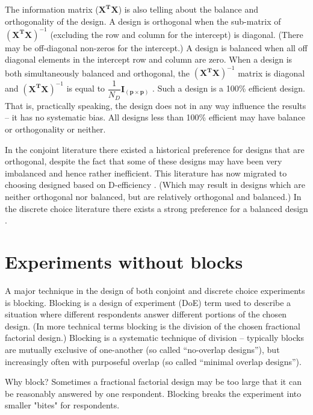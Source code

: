 \documentclass{article}
\begin{document}
The information matrix ($\mathbf{X^{T}X}$) is also telling about the balance and orthogonality of the design.
A design is orthogonal when the sub-matrix of $(\mathbf{X^{T}X})^{-1}$ (excluding the row and column for the intercept) is diagonal. (There may be off-diagonal non-zeros for the intercept.)
A design is balanced when all off diagonal elements in the intercept row and column are zero.
When a design is both simultaneously balanced and orthogonal, the $(\mathbf{X^{T}X})^{-1}$ matrix is diagonal and $(\mathbf{X^{T}X})^{-1}$ is equal to $\dfrac{1}{N_D}\mathbf{I_{(p\times p)}}$ \citep[63]{kuhfeld2010marketingresearch}.
Such a design is a 100\% efficient design.
That is, practically speaking, the design does not in any way influence the results -- it has no systematic bias.
All designs less than 100\% efficient may have balance or orthogonality or neither.

In the conjoint literature there existed a historical preference for designs that are orthogonal, despite the fact that some of these designs may have been very imbalanced and hence rather inefficient.
This literature has now migrated to choosing designed based on D-efficiency \citep{kuhfeld2010marketingresearch}.
(Which may result in designs which are neither orthogonal nor balanced, but are relatively orthogonal and balanced.)
In the discrete choice literature there exists a strong preference for a balanced design \citep{hensherrosegreene2015}.

\section{Experiments without blocks}
A major technique in the design of both conjoint and discrete choice experiments is blocking.
Blocking is a design of experiment (DoE) term used to describe a situation where different respondents answer different portions of the chosen design.
(In more technical terms blocking is the division of the chosen fractional factorial design.)
Blocking is a systematic technique of division -- typically blocks are mutually exclusive of one-another (so called \enquote{no-overlap designs}), but increasingly often with purposeful overlap (so called \enquote{minimal overlap designs}).

Why block?
Sometimes a fractional factorial design may be too large that it can be reasonably answered by one respondent.
Blocking breaks the experiment into smaller "bites" for respondents.
\end{document}
